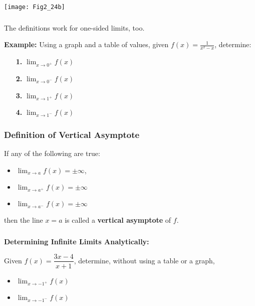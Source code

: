 \documentclass[14pt]{beamer}
\begin{document}
\begin{frame}
\begin{center}
\noindent\texttt{[image: Fig2\_24b]} 
\end{center}
\end{frame}

\begin{frame}
\frametitle{}
\small The definitions work for one-sided limits, too.  

\vspace{0.5pc}
{\bf Example:} Using a graph and a table of values, given $f(x)=\displaystyle\frac{1}{x^2-x}$, determine:
\begin{itemize}
\item[\bf 1.\;] $\displaystyle\lim_{x \to 0^+} f(x)$
\item[\bf 2.\;] $\displaystyle\lim_{x \to 0^-} f(x)$
\item[\bf 3.\;] $\displaystyle\lim_{x \to 1^+} f(x)$
\item[\bf 4.\;] $\displaystyle\lim_{x \to 1^-} f(x)$ 
\end{itemize}
\end{frame}

\begin{frame}
\frametitle{Definition of Vertical Asymptote}
If any of the following are true:
\begin{itemize}
\item $\displaystyle\lim_{x \to a} f(x) = \pm\infty$,
\item $\displaystyle\lim_{x \to a^+} f(x) = \pm\infty$
\item $\displaystyle\lim_{x \to a^-} f(x) = \pm\infty$
\end{itemize}
then the line $x=a$ is called a {\bf vertical asymptote} of $f$.
\end{frame}

\begin{frame}
\frametitle{}
{\bf Determining Infinite Limits Analytically:}

\small
\vspace{0.75pc}
Given $f(x)=\dfrac{3x-4}{x+1}$, determine, without using a table or a graph, 

\vspace{0.25pc}
\begin{itemize}
\item $\displaystyle\lim_{x \to -1^+} f(x)$ 
\item $\displaystyle\lim_{x \to -1^-} f(x)$
\end{itemize}
\end{frame}
\end{document}
